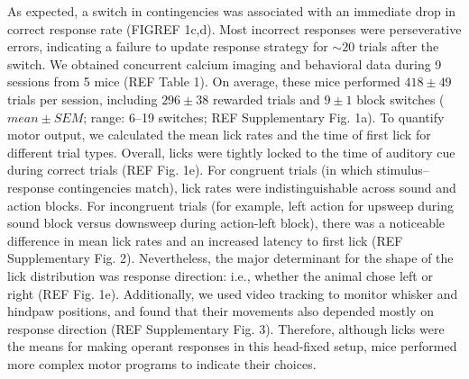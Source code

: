 As expected, a switch in contingencies was associated with an immediate drop in correct response rate (FIGREF 1c,d). Most incorrect responses were perseverative errors, indicating a failure to update response strategy for $\sim 20$ trials after the switch. We obtained concurrent calcium imaging and behavioral data during 9 sessions from 5 mice (REF Table 1). On average, these mice performed $418 \pm 49$ trials per session, including $296 \pm 38$ rewarded trials and $9 \pm 1$ block switches ($mean \pm SEM$; range: 6–19 switches; REF Supplementary Fig. 1a). To quantify motor output, we calculated the mean lick rates and the time of first lick for different trial types. Overall, licks were tightly locked to the time of auditory cue during correct trials (REF Fig. 1e). For congruent trials (in which stimulus--response contingencies match), lick rates were indistinguishable across sound and action blocks. For incongruent trials (for example, left action for upsweep during sound block versus downsweep during action-left block), there was a noticeable difference in mean lick rates and an increased latency to first lick (REF Supplementary Fig. 2). Nevertheless, the major determinant for the shape of the lick distribution was response direction: i.e., whether the animal chose left or right (REF Fig. 1e). Additionally, we used video tracking to monitor whisker and hindpaw positions, and found that their movements also depended mostly on response direction (REF Supplementary Fig. 3). Therefore, although licks were the means for making operant responses in this head-fixed setup, mice performed more complex motor programs to indicate their choices.


